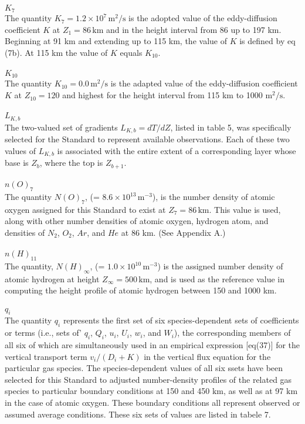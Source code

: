 \documentclass{article}
\begin{document}
\\$K_7$\\
The quantity $K_7 = 1.2 \times 10^7 \, \mathrm{m^2/s}$ is the adopted value of the eddy-diffusion coefficient $K$ at $Z_1 = 86 \, \mathrm{km}$ and in the height interval from 86 up to 197 km. Beginning at 91 km and extending up to 115 km, the value of $K$ is defined by eq (7b). At 115 km the value of $K$ equals $K_{10}$.\\
\\$K_{10}$\\
The quantity $K_{10} = 0.0 \, \text{m}^2/\text{s}$ is the adapted value of the eddy-diffusion coefficient $K$ at $Z_{10} = 120$ and highest for the height interval from 115 km to 1000 $ \text{m}^2/\text{s}$.\\
\\$L_{K,b}$\\
The two-valued set of gradients $L_{K,b} = dT/dZ$, listed in table 5, was specifically selected for the Standard to represent available observations. Each of these two values of $L_{K,b}$ is associated with the entire extent of a corresponding layer whose base is $Z_b$, where the top is $Z_{b+1}$.\\
\\$n(O)_7$\\
The quantity $N(O)_7$, (= $8.6 \times 10^{13} \, \text{m}^{-3}$), is the number density of atomic oxygen assigned for this Standard to exist at $Z_7 = 86 \, \text{km}$. This value is used, along with other number densities of atomic oxygen, hydrogen atom, and densities of $N_2$, $O_2$, $Ar$, and $He$ at 86 km. (See Appendix A.)\\
\\$n(H)_{11}$\\
The quantity, $N(H)_\infty$, (= $1.0 \times 10^{10} \, \text{m}^{-3}$) is the assigned number density of atomic hydrogen at height $Z_\infty = 500 \, \text{km}$, and is used as the reference value in computing the height profile of atomic hydrogen between 150 and 1000 km.\\
\\$q_i$\\
The quantity $q_i$ represents the first set of six species-dependent sets of coefficients or terms (i.e., sets of' $q_i$, $Q_i$, $u_i$, $U_i$, $w_i$, and $W_i$), the corresponding members of all six of which are simultaneously used in an empirical expression [eq(37)] for the vertical transport term $v_i/(D_i+K)$ in the vertical flux equation for the particular gas species. The species-dependent values of all six ssets have been selected for this Standard to adjusted number-density profiles of the related gas species to particular boundary conditions at 150 and 450 $\mathrm{km}$, as well as at 97 $\mathrm{km}$ in the case of atomic oxygen. These boundary conditions all represent observed or assumed average conditions. These six sets of values are listed in tabele 7.\\
\end{document}
